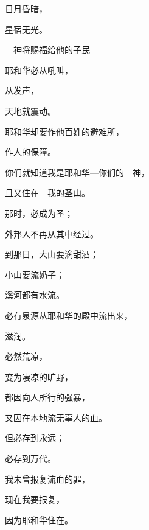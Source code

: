 {\par }{\Q {}日月昏暗，
\par }{\Q 星宿无光。
\par }{\SH 　神将赐福给他的子民
\par }{\Q {}耶和华必从{}吼叫，
\par }{\Q 从{}发声，
\par }{\Q 天地就震动。
\par }{\Q 耶和华却要作他百姓的避难所，
\par }{\Q 作{}人的保障。
\par }{\BB \par }{\Q {}你们就知道我是耶和华—你们的　神，
\par }{\Q 且又住在{}—我的圣山。
\par }{\Q 那时，{}必成为圣；
\par }{\Q 外邦人不再从其中经过。
\par }{\BB \par }{\Q {}到那日，大山要滴甜酒；
\par }{\Q 小山要流奶子；
\par }{溪河都有水流。
\par }{\Q 必有泉源从耶和华的殿中流出来，
\par }{\Q 滋润{}。
\par }{\BB \par }{\Q {}必然荒凉，
\par }{变为凄凉的旷野，
\par }{\Q 都因向{}人所行的强暴，
\par }{\Q 又因在本地流无辜人的血。
\par }{\Q {}但{}必存到永远；
\par }{必存到万代。
\par }{\Q {}我未曾报复流血的罪，
\par }{\Q 现在我要报复，
\par }{\Q 因为耶和华住在{}。
\par }